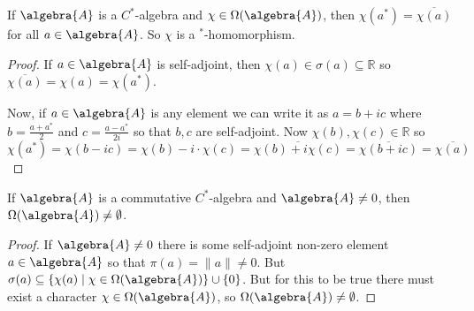\documentclass[a4paper]{article}
\begin{document}
\begin{corollary}
	If $\algebra{A}$ is a $C^*$-algebra and $\chi \in \Omega(\algebra{A})$, then $\chi(a^*) = \overline{\chi(a)}$ for all $a \in \algebra{A}$.
	So $\chi$ is a $^*$-homomorphism.
\end{corollary}

\begin{proof}
	If $a \in \algebra{A}$ is self-adjoint, then $\chi(a) \in \sigma(a) \subseteq \mathds{R}$ so $\overline{\chi(a)} = \chi(a) = \chi(a^*)$.

	Now, if $a \in \algebra{A}$ is any element we can write it as $a = b + i c$ where $b = \frac{a + a^*}{2}$ and $c = \frac{a - a^*}{2i}$ so that $b,c$ are self-adjoint. Now $\chi(b),\chi(c) \in \mathds{R}$ so
	\begin{equation*}
		\chi(a^*) = \chi(b - ic) = \chi(b) - i \cdot \chi(c) = \overline{\chi(b) + i \chi(c)} = \overline{\chi(b + ic)} = \overline{\chi(a)}
	\end{equation*}
\end{proof}

\begin{corollary}
	If $\algebra{A}$ is a commutative $C^*$-algebra and $\algebra{A} \neq 0$, then $\Omega(\algebra{A}) \neq \emptyset$.
\end{corollary}

\begin{proof}
	If $\algebra{A} \neq 0$ there is some self-adjoint non-zero element $a \in \algebra{A}$ so that $\pi(a) = \|a\| \neq 0$. But $\sigma(a) \subseteq \{ \chi(a) \mid \chi \in \Omega(\algebra{A}) \} \cup \{0\}$.
	But for this to be true there must exist a character $\chi \in \Omega(\algebra{A})$, so $\Omega(\algebra{A}) \neq \emptyset$.
\end{proof}
\end{document}
